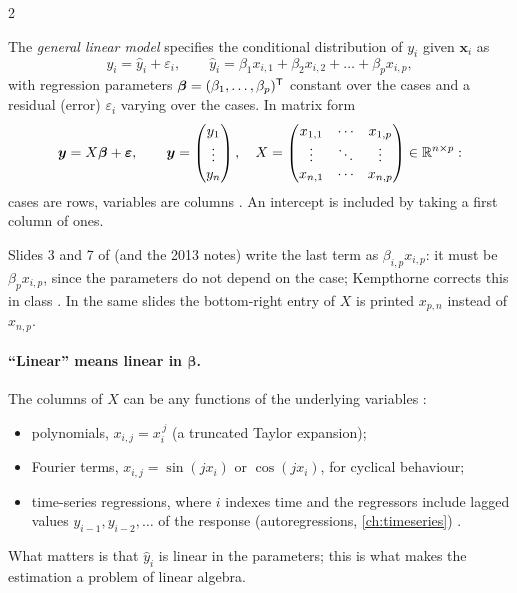\begin{paracol}{2}
\begin{definition}\label{ch05:def-linmodel}
The \emph{general linear model} specifies the conditional distribution of $y_i$ given $\bm x_i$ as
\[
  y_i = \hat y_i + \varepsilon_i,\qquad \hat y_i=\beta_1x_{i,1}+\beta_2x_{i,2}+\dots+\beta_px_{i,p},
\]
with regression parameters $\bm\beta=(\beta_1,\dots,\beta_p)^{\mathsf T}$ constant over the cases and a residual
(error) $\varepsilon_i$ varying over the cases. In matrix form
\[
  \bm y = X\bm\beta+\bm\varepsilon,\qquad
  \bm y=\begin{pmatrix}y_1\\ \vdots\\ y_n\end{pmatrix},\quad
  X=\begin{pmatrix}x_{1,1}&\cdots&x_{1,p}\\ \vdots&\ddots&\vdots\\ x_{n,1}&\cdots&x_{n,p}\end{pmatrix}\in\mathbb{R}^{n\times p}:
\]
cases are rows, variables are columns . An intercept is included by taking a first
column of ones.
\end{definition}

\begin{coursenote}
Slides 3 and 7 of  (and the 2013 notes) write the last term as $\beta_{i,p}x_{i,p}$: it must
be $\beta_px_{i,p}$, since the parameters do not depend on the case; Kempthorne corrects this in class
. In the same slides the bottom-right entry of $X$ is printed $x_{p,n}$ instead of
$x_{n,p}$.
\end{coursenote}

\paragraph{``Linear'' means linear in $\bm\beta$.} The columns of $X$ can be any functions of the
underlying variables  :
\begin{itemize}
  \item polynomials, $x_{i,j}=x_i^{\,j}$ (a truncated Taylor expansion);
  \item Fourier terms, $x_{i,j}=\sin(jx_i)$ or $\cos(jx_i)$, for cyclical behaviour;
  \item time-series regressions, where $i$ indexes time and the regressors include lagged values
        $y_{i-1},y_{i-2},\dots$ of the response (autoregressions, \cref{ch:timeseries}) .
\end{itemize}
What matters is that $\hat y_i$ is linear in the parameters; this is what makes the estimation a problem
of linear algebra.


\end{paracol}
